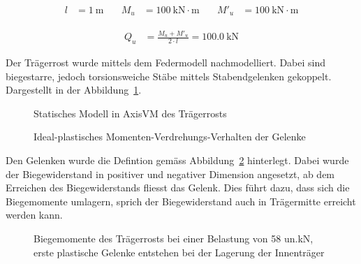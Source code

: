\documentclass[
  11pt,
  letterpaper,
]{scrreprt}
\begin{document}
\[
\begin{aligned}
l& = 1 \ \mathrm{m} \quad & M_{u}& = 100 \ \mathrm{kN} \cdot \mathrm{m} \quad & {M}'_{u}& = 100 \ \mathrm{kN} \cdot \mathrm{m} \end{aligned}
\]

\[
\begin{aligned}
Q_{u}& = \frac{M_{u} + {M}'_{u}}{2 \cdot l} = 100.0 \ \mathrm{kN} \end{aligned}
\]

Der Trägerrost wurde mittels dem Federmodell nachmodelliert. Dabei sind
biegestarre, jedoch torsionsweiche Stäbe mittels Stabendgelenken
gekoppelt. Dargestellt in der Abbildung~\ref{fig-trm_geom}.

\begin{figure}[H]


\caption{\label{fig-trm_geom}Statisches Modell in AxisVM des
Trägerrosts}

\end{figure}%

\begin{figure}[H]


\caption{\label{fig-trm_gelenkdef}Ideal-plastisches
Momenten-Verdrehungs-Verhalten der Gelenke}

\end{figure}%

Den Gelenken wurde die Defintion gemäss
Abbildung~\ref{fig-trm_gelenkdef} hinterlegt. Dabei wurde der
Biegewiderstand in positiver und negativer Dimension angesetzt, ab dem
Erreichen des Biegewiderstands fliesst das Gelenk. Dies führt dazu, dass
sich die Biegemomente umlagern, sprich der Biegewiderstand auch in
Trägermitte erreicht werden kann.

\begin{figure}[H]


\caption{\label{fig-trm_my58}Biegemomente des Trägerrosts bei einer
Belastung von 58 un.kN, erste plastische Gelenke entstehen bei der
Lagerung der Innenträger}

\end{figure}%
\end{document}
